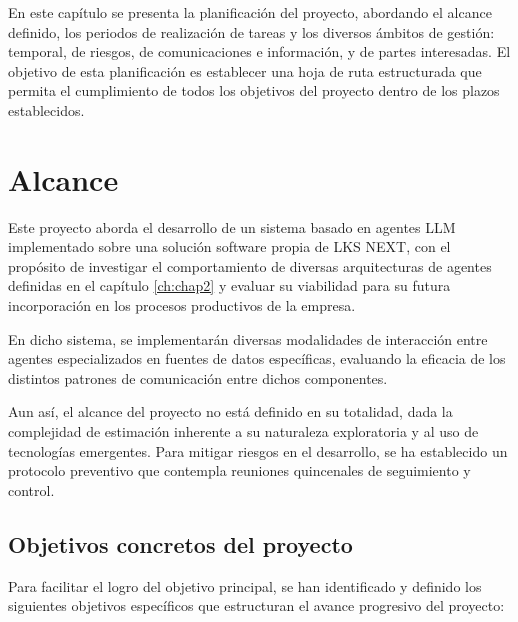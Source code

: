 

En este capítulo se presenta la planificación del proyecto, abordando el alcance definido, los periodos de realización de tareas y los diversos ámbitos de gestión: temporal, de riesgos, de comunicaciones e información, y de partes interesadas. El objetivo de esta planificación es establecer una hoja de ruta estructurada que permita el cumplimiento de todos los objetivos del proyecto dentro de los plazos establecidos.

\section{Alcance}

Este proyecto aborda el desarrollo de un sistema basado en agentes LLM implementado sobre una solución software propia de LKS NEXT, con el propósito de investigar el comportamiento de diversas arquitecturas de agentes definidas en el capítulo \ref{ch:chap2} y evaluar su viabilidad para su futura incorporación en los procesos productivos de la empresa.

En dicho sistema, se implementarán diversas modalidades de interacción entre agentes especializados en fuentes de datos específicas, evaluando la eficacia de los distintos patrones de comunicación entre dichos componentes.

Aun así, el alcance del proyecto no está definido en su totalidad, dada la complejidad de estimación inherente a su naturaleza exploratoria y al uso de tecnologías emergentes. Para mitigar riesgos en el desarrollo, se ha establecido un protocolo preventivo que contempla reuniones quincenales de seguimiento y control.

\subsection{Objetivos concretos del proyecto}

Para facilitar el logro del objetivo principal, se han identificado y definido los siguientes objetivos específicos que estructuran el avance progresivo del proyecto:

